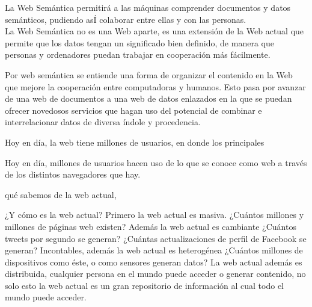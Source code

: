 





La Web Semántica permitirá a las máquinas comprender documentos y datos semánticos, pudiendo asÍ colaborar entre ellas y con las personas.\\

La Web Semántica no es una Web aparte, es una extensión de la Web actual que permite que los datos tengan un significado bien definido, de manera que personas y ordenadores puedan trabajar en cooperación más fácilmente.


Por web semántica se entiende una forma de organizar el contenido en la Web que mejore la cooperación entre computadoras y humanos. Esto pasa por avanzar de una web de documentos a una web de datos enlazados en la que se puedan ofrecer novedosos servicios que hagan uso del potencial de combinar e interrelacionar datos de diversa índole y procedencia.


Hoy en día, la web tiene millones de usuarios, en donde los principales 


Hoy en día, millones de usuarios hacen uso de lo que se conoce como web a través de los distintos navegadores que hay. 


qué sabemos de la web actual, 



 ¿Y cómo es la web actual? Primero la web actual es masiva. ¿Cuántos millones y millones de páginas web existen? Además la web actual es cambiante ¿Cuántos tweets por segundo se generan? ¿Cuántas actualizaciones de perfil de Facebook se generan? Incontables, además la web actual es heterogénea ¿Cuántos millones de dispositivos como éste, o como sensores generan datos? La web actual además es distribuida, cualquier persona en el mundo puede acceder o generar contenido, no solo esto la web actual es un gran repositorio de información al cual todo el mundo puede acceder.
 
